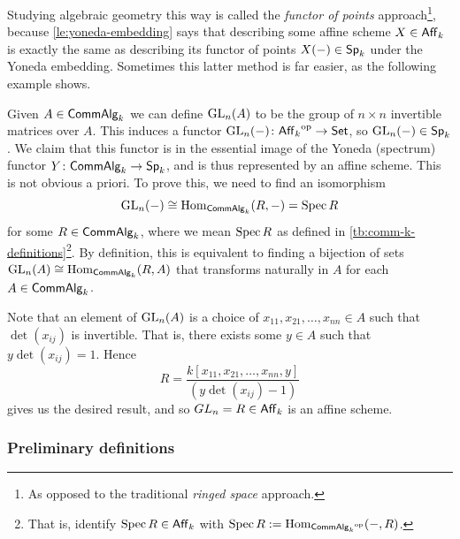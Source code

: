         Studying algebraic geometry this way is called the \emph{functor of points} approach\footnote{
            As opposed to the traditional \emph{ringed space} approach.
        }, because \cref{le:yoneda-embedding} says that describing some affine scheme $X\in\mathsf{Aff}_{k}$ is exactly the same as describing its functor of points $X({-})\in\mathsf{Sp}_{k}$ under the Yoneda embedding.
        Sometimes this latter method is far easier, as the following example shows.

        \begin{example}[$\GL_n$]\label{ex:gln-affine-scheme}
            Given $A\in\mathsf{CommAlg}_k$ we can define $\operatorname{GL}_n(A)$ to be the group of $n\times n$ invertible matrices over $A$.
            This induces a functor $\operatorname{GL}_n({-})\colon{\mathsf{Aff}_{k}}^{\mathrm{op}}\to\mathsf{Set}$, so $\operatorname{GL}_n({-})\in\mathsf{Sp}_{k}$.
            We claim that this functor is in the essential image of the Yoneda (spectrum) functor $Y\colon\mathsf{CommAlg}_k\to\mathsf{Sp}_{k}$, and is thus represented by an affine scheme.
            This is not obvious a priori.
            To prove this, we need to find an isomorphism
            \begin{equation*}
                \operatorname{GL}_n({-})\cong\operatorname{Hom}_{\mathsf{CommAlg}_k}(R,{-})=\operatorname{Spec} R
            \end{equation*}
            for some $R\in\mathsf{CommAlg}_k$, where we mean $\operatorname{Spec} R$ as defined in \cref{tb:comm-k-definitions}\footnote{
                That is, identify $\operatorname{Spec} R\in\mathsf{Aff}_{k}$ with $\operatorname{Spec} R:=\operatorname{Hom}_{{\mathsf{CommAlg}_k}^{\mathrm{op}}}({-},R)$.
            }.
            By definition, this is equivalent to finding a bijection of sets $\operatorname{GL}_n(A)\cong\operatorname{Hom}_{\mathsf{CommAlg}_k}(R,A)$ that transforms naturally in $A$ for each $A\in\mathsf{CommAlg}_k$.

            Note that an element of $\operatorname{GL}_n(A)$ is a choice of $x_{11},x_{21},\ldots,x_{nn}\in A$ such that $\det(x_{ij})$ is invertible.
            That is, there exists some $y\in A$ such that $y\det(x_{ij})=1$.
            Hence
            \begin{equation*}
                R=\frac{k[x_{11},x_{21},\ldots,x_{nn},y]}{(y\det(x_{ij})-1)}
            \end{equation*}
            gives us the desired result, and so $GL_n=R\in\mathsf{Aff}_{k}$ is an affine scheme.
        \end{example}



    \subsubsection{Preliminary definitions} %
    \label{ssub:preliminary_definitions}

